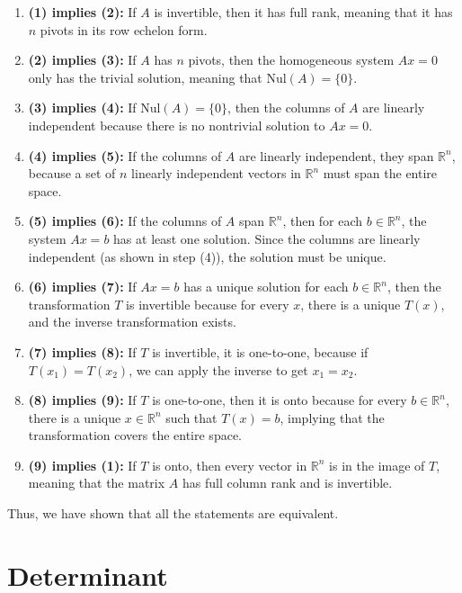 \documentclass[a4paper,12pt]{article}
\begin{document}
\begin{enumerate}
    \item \textbf{(1) implies (2):} If \( A \) is invertible, then it has full rank, meaning that it has \( n \) pivots in its row echelon form.
    \item \textbf{(2) implies (3):} If \( A \) has \( n \) pivots, then the homogeneous system \( Ax = 0 \) only has the trivial solution, meaning that \( \text{Nul}(A) = \{0\} \).
    \item \textbf{(3) implies (4):} If \( \text{Nul}(A) = \{0\} \), then the columns of \( A \) are linearly independent because there is no nontrivial solution to \( Ax = 0 \).
    \item \textbf{(4) implies (5):} If the columns of \( A \) are linearly independent, they span \( \mathbb{R}^n \), because a set of \( n \) linearly independent vectors in \( \mathbb{R}^n \) must span the entire space.
    \item \textbf{(5) implies (6):} If the columns of \( A \) span \( \mathbb{R}^n \), then for each \( b \in \mathbb{R}^n \), the system \( Ax = b \) has at least one solution. Since the columns are linearly independent (as shown in step (4)), the solution must be unique.
    \item \textbf{(6) implies (7):} If \( Ax = b \) has a unique solution for each \( b \in \mathbb{R}^n \), then the transformation \( T \) is invertible because for every \( x \), there is a unique \( T(x) \), and the inverse transformation exists.
    \item \textbf{(7) implies (8):} If \( T \) is invertible, it is one-to-one, because if \( T(x_1) = T(x_2) \), we can apply the inverse to get \( x_1 = x_2 \).
    \item \textbf{(8) implies (9):} If \( T \) is one-to-one, then it is onto because for every \( b \in \mathbb{R}^n \), there is a unique \( x \in \mathbb{R}^n \) such that \( T(x) = b \), implying that the transformation covers the entire space.
    \item \textbf{(9) implies (1):} If \( T \) is onto, then every vector in \( \mathbb{R}^n \) is in the image of \( T \), meaning that the matrix \( A \) has full column rank and is invertible.
\end{enumerate}

Thus, we have shown that all the statements are equivalent.
\newpage
\Large \section{Determinant}
\end{document}
